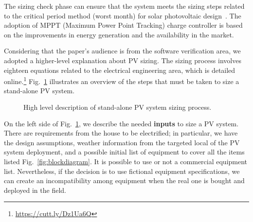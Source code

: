 \documentclass[journal]{IEEEtran}
\begin{document}
The sizing check phase can ensure that the system meets the sizing steps related to the critical period method (worst month) for solar photovoltaic design~\cite{Pinho}. The adoption of MPPT (Maximum Power Point Tracking) charge controller is based on the improvements in energy generation and the availability in the market. 
 

Considering that the paper's audience is from the software verification area, we adopted a higher-level explanation about PV sizing. The sizing process involves eighteen equations related to the electrical engineering area, which is detailed online.\footnote{\href{https://cutt.ly/Dz1Ua6Q}{https://cutt.ly/Dz1Ua6Q}} 
Fig.~\ref{fig:flow} illustrates an overview of the steps that must be taken to size a stand-alone PV system.
%
\begin{figure}[ht]
\centering
\caption{High level description of stand-alone PV system sizing process.}
\label{fig:flow} 
\end{figure}
 

On the left side of Fig.~\ref{fig:flow}, we describe the needed \textbf{inputs} to size a PV system. There are requirements from the house to be electrified; in particular, we have the design assumptions, weather information from the targeted local of the PV system deployment, and a possible initial list of equipment to cover all the items listed Fig.~\ref{fig:blockdiagram}. It is possible to use or not a commercial equipment list. Nevertheless, if the decision is to use fictional equipment specifications, we can create an incompatibility among equipment when the real one is bought and deployed in the field.
 
\end{document}
